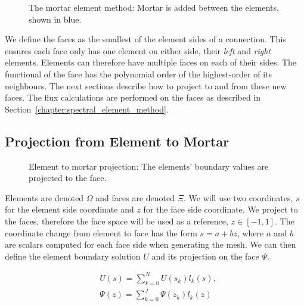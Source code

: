 \begin{figure}[H]
	\centering
	
	\caption{The mortar element method: Mortar is added between the elements, shown in blue.}\label{fig:mortar_element_method}
\end{figure}

We define the faces as the smallest of the element sides of a connection. This ensures each face
only has one element on either side, their \textit{left} and \textit{right} elements. Elements can
therefore have multiple faces on each of their sides. The functional of the face has the polynomial
order of the highest-order of its neighbours. The next sections describe how to project to and from
these new faces. The flux calculations are performed on the faces as described in
Section~\ref{chapter:spectral_element_method}. 

\subsection{Projection from Element to Mortar}\label{subsection:adaptive_mesh_refinement:mortar_element_method:element_to_mortar}

\begin{figure}[H]
	\centering
	
	\caption{Element to mortar projection: The elements' boundary values are projected to the face.}\label{fig:element_to_mortar}
\end{figure}

Elements are denoted \(\Omega \) and faces are denoted \(\Xi \). We will use two coordinates, \(s\)
for the element side coordinate and \(z\) for the face side coordinate. We project to the faces,
therefore the face space will be used as a reference, \(z \in [-1, 1]\). The coordinate change from
element to face has the form \(s = a + bz\), where \(a\) and \(b\) are scalars computed for each
face side when generating the mesh. We can then define the element boundary solution \(U\) and its
projection on the face \(\Psi \). 

\begin{align} 
	& U(s) = \sum_{k = 0}^{N} U(s_k) l_k(s), \label{equ:element_boundary_solution} \\
	& \Psi (z) = \sum_{k = 0}^{J} \Psi(z_k) l_k(z) \label{equ:face_projected_solution}
\end{align}

